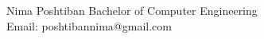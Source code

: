 \documentclass[10pt,journal,compsoc]{IEEEtran}
\begin{document}


	\begin{IEEEbiographynophoto}{Nima Poshtiban}
		Bachelor of Computer Engineering\\
		Email: poshtibannima@gmail.com
	\end{IEEEbiographynophoto}




	\vfill




\end{document}
